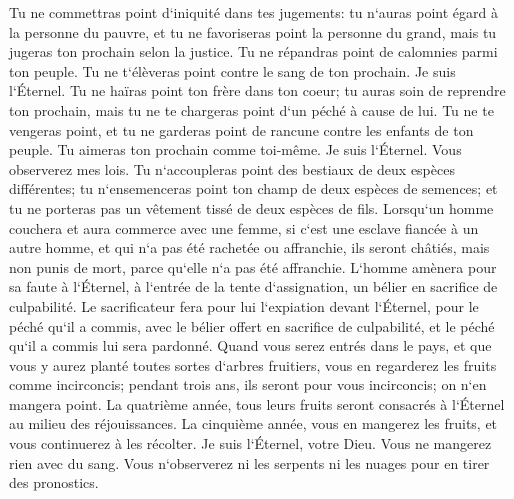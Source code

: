 \verse Tu ne commettras point d`iniquité dans tes jugements: tu n`auras point égard à la personne du pauvre, et tu ne favoriseras point la personne du grand, mais tu jugeras ton prochain selon la justice. 
\verse Tu ne répandras point de calomnies parmi ton peuple. Tu ne t`élèveras point contre le sang de ton prochain. Je suis l`Éternel. 
\verse Tu ne haïras point ton frère dans ton coeur; tu auras soin de reprendre ton prochain, mais tu ne te chargeras point d`un péché à cause de lui. 
\verse Tu ne te vengeras point, et tu ne garderas point de rancune contre les enfants de ton peuple. Tu aimeras ton prochain comme toi-même. Je suis l`Éternel. 
\verse Vous observerez mes lois. Tu n`accoupleras point des bestiaux de deux espèces différentes; tu n`ensemenceras point ton champ de deux espèces de semences; et tu ne porteras pas un vêtement tissé de deux espèces de fils. 
\verse Lorsqu`un homme couchera et aura commerce avec une femme, si c`est une esclave fiancée à un autre homme, et qui n`a pas été rachetée ou affranchie, ils seront châtiés, mais non punis de mort, parce qu`elle n`a pas été affranchie. 
\verse L`homme amènera pour sa faute à l`Éternel, à l`entrée de la tente d`assignation, un bélier en sacrifice de culpabilité. 
\verse Le sacrificateur fera pour lui l`expiation devant l`Éternel, pour le péché qu`il a commis, avec le bélier offert en sacrifice de culpabilité, et le péché qu`il a commis lui sera pardonné. 
\verse Quand vous serez entrés dans le pays, et que vous y aurez planté toutes sortes d`arbres fruitiers, vous en regarderez les fruits comme incirconcis; pendant trois ans, ils seront pour vous incirconcis; on n`en mangera point. 
\verse La quatrième année, tous leurs fruits seront consacrés à l`Éternel au milieu des réjouissances. 
\verse La cinquième année, vous en mangerez les fruits, et vous continuerez à les récolter. Je suis l`Éternel, votre Dieu. 
\verse Vous ne mangerez rien avec du sang. Vous n`observerez ni les serpents ni les nuages pour en tirer des pronostics. 
